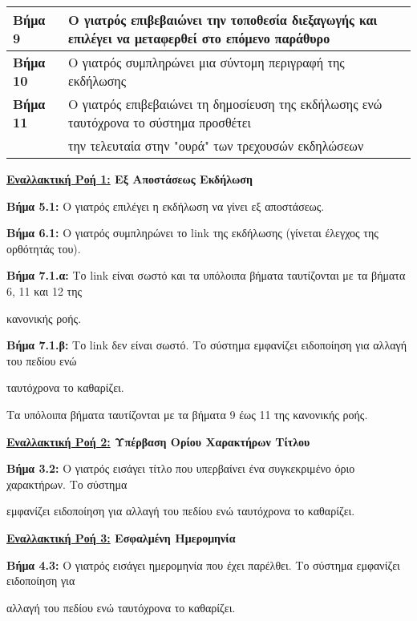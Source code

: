 \documentclass{article}
\newcommand\T{\rule{0pt}{2.6ex}}       %
\newcommand\B{\rule[-1.2ex]{0pt}{0pt}}
\begin{document}
\begin{center}
\begin{tabular}{|l|l|}
      \hline
       \textbf{Βήμα 9} & Ο γιατρός επιβεβαιώνει την τοποθεσία διεξαγωγής και επιλέγει να μεταφερθεί στο επόμενο παράθυρο \T\B \\
      \hline
       \textbf{Βήμα 10} & Ο γιατρός συμπληρώνει μια σύντομη περιγραφή της εκδήλωσης \T\B \\
      \hline
       \textbf{Βήμα 11} & Ο γιατρός επιβεβαιώνει τη δημοσίευση της εκδήλωσης ενώ ταυτόχρονα το σύστημα προσθέτει \T \\& την τελευταία στην "ουρά" των τρεχουσών εκδηλώσεων \B \\
      \hline
     \end{tabular}
 \end{center}
 
 \newpage
 
\textbf{\underline{Εναλλακτική Ροή 1:} Εξ Αποστάσεως Εκδήλωση} \vspace{0.2cm}
\par \textbf{Βήμα 5.1:} Ο γιατρός επιλέγει η εκδήλωση να γίνει εξ αποστάσεως.\vspace{0.1cm}

\par\textbf{Βήμα 6.1:} Ο γιατρός συμπληρώνει το link της εκδήλωσης (γίνεται έλεγχος της ορθότητάς του). \vspace{0.1cm}
\par \textbf{Βήμα 7.1.α:} Το link είναι σωστό και τα υπόλοιπα βήματα ταυτίζονται με τα βήματα 6, 11 και 12 της \par κανονικής ροής. \vspace{0.2cm}
\par \textbf{Βήμα 7.1.β:} Το link δεν είναι σωστό. Το σύστημα εμφανίζει ειδοποίηση για αλλαγή του πεδίου ενώ \par ταυτόχρονα το καθαρίζει. \vspace{0.2cm}

Tα υπόλοιπα βήματα ταυτίζονται με τα βήματα 9 έως 11 της κανονικής ροής. \vspace{0.2cm}

\textbf{\underline{Εναλλακτική Ροή 2:} Υπέρβαση Ορίου Χαρακτήρων Τίτλου} \vspace{0.2cm}
\par \textbf{Βήμα 3.2:} Ο γιατρός εισάγει τίτλο που υπερβαίνει ένα συγκεκριμένο όριο χαρακτήρων. Το σύστημα \par εμφανίζει ειδοποίηση για αλλαγή του πεδίου ενώ ταυτόχρονα το καθαρίζει. \vspace{0.2cm}

\textbf{\underline{Εναλλακτική Ροή 3:} Εσφαλμένη Ημερομηνία} \vspace{0.2cm}
\par \textbf{Βήμα 4.3:} Ο γιατρός εισάγει ημερομηνία που έχει παρέλθει. Το σύστημα εμφανίζει ειδοποίηση για \par αλλαγή του πεδίου ενώ ταυτόχρονα το καθαρίζει.
\vspace{0.2cm}
\end{document}
